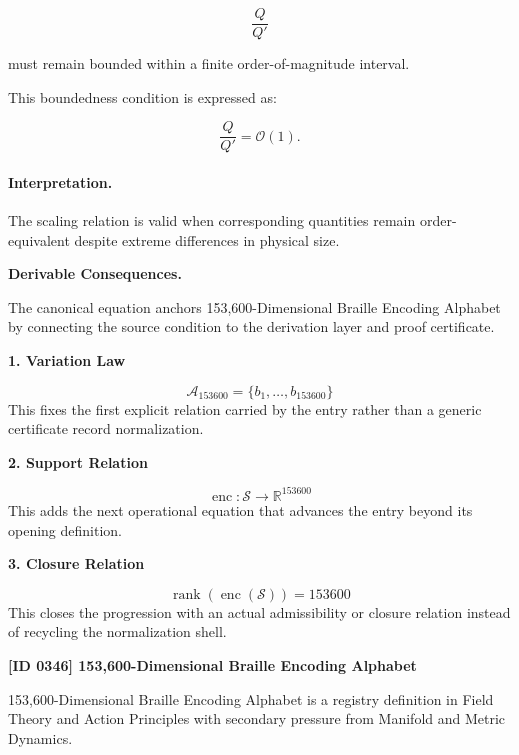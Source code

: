 \begin{equation}
\frac{Q}{Q'}
\end{equation}

must remain bounded within a finite order-of-magnitude interval.

This boundedness condition is expressed as:

\begin{equation}
\boxed{
\frac{Q}{Q'}
=
\mathcal{O}(1).
}
\end{equation}

\paragraph{Interpretation.}
The scaling relation is valid when corresponding quantities remain order-equivalent despite extreme differences in physical size.

\par\vspace{0.35em}
\noindent\textbf{Derivable Consequences.}\quad
\begingroup
\footnotesize
\raggedright
The canonical equation anchors 153,600-Dimensional Braille Encoding Alphabet by connecting the source condition to the derivation layer and proof certificate.
\par\endgroup

\noindent\textbf{1. Variation Law}\par
\[
\mathcal{A}_{153600}=\{b_{1},\ldots,b_{153600}\}
\]
\noindent This fixes the first explicit relation carried by the entry rather than a generic certificate record normalization.\par
\noindent\textbf{2. Support Relation}\par
\[
\operatorname{enc}:\mathcal{S}\to\mathbb{R}^{153600}
\]
\noindent This adds the next operational equation that advances the entry beyond its opening definition.\par
\noindent\textbf{3. Closure Relation}\par
\[
\operatorname{rank}(\operatorname{enc}(\mathcal{S}))=153600
\]
\noindent This closes the progression with an actual admissibility or closure relation instead of recycling the normalization shell.\par

\clearpage
\noindent\textbf{[ID 0346] 153,600-Dimensional Braille Encoding Alphabet}\par
\vspace{0.35em}
\begingroup\small
{}
153,600-Dimensional Braille Encoding Alphabet is a registry definition in Field Theory and Action Principles with secondary pressure from Manifold and Metric Dynamics.

